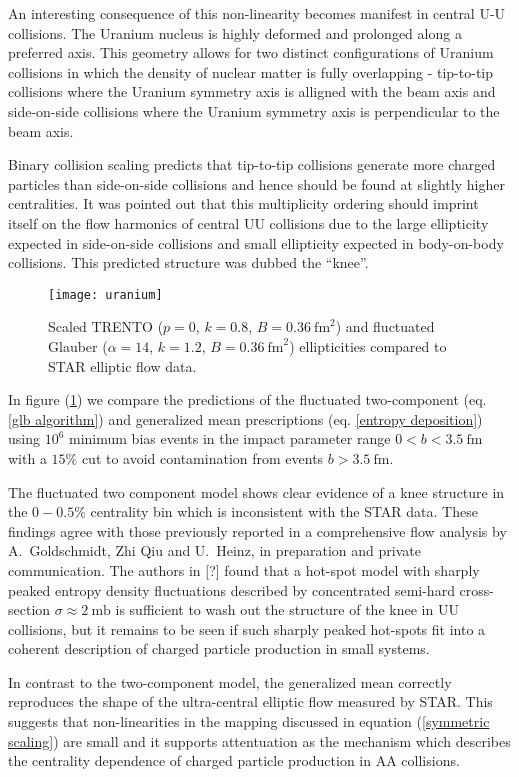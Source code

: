 \documentclass[aps,prl,reprint,amsmath,nofootinbib]{revtex4-1}
\begin{document}
An interesting consequence of this non-linearity becomes manifest in central U-U collisions. The Uranium
nucleus is highly deformed and prolonged along a preferred axis. This geometry allows for two distinct
configurations of Uranium collisions in which the density of nuclear matter is fully overlapping - tip-to-tip
collisions where the Uranium symmetry axis is alligned with the beam axis and side-on-side collisions where
the Uranium symmetry axis is perpendicular to the beam axis.

Binary collision scaling predicts that tip-to-tip collisions generate more charged particles than side-on-side
collisions and hence should be found at slightly higher centralities. It was pointed out that this
multiplicity ordering should imprint itself on the flow harmonics of central UU collisions due to the large
ellipticity expected in side-on-side collisions and small ellipticity expected in body-on-body collisions.
This predicted structure was dubbed the ``knee''.

\begin{figure}
  \centering
  \texttt{[image: uranium]}
  \caption{\label{fig:knee}Scaled TRENTO ($p=0$, $k=0.8$, $B=0.36~\mathrm{fm}^2$) and fluctuated Glauber
  ($\alpha=14$, $k=1.2$, $B=0.36~\mathrm{fm}^2$) ellipticities compared to STAR elliptic flow data.}
\end{figure}

In figure (\ref{fig:knee}) we compare the predictions of the fluctuated two-component (eq. \ref{glb algorithm})
and generalized mean prescriptions (eq. \ref{entropy deposition}) using $10^6$ minimum bias events
in the impact parameter range $0<b<3.5 ~\mathrm{fm}$ with a $15\%$ cut to avoid contamination from events
$b>3.5 ~\mathrm{fm}$.

The fluctuated two component model shows clear evidence of a knee structure in the $0-0.5\%$ centrality bin
which is inconsistent with the STAR data. These findings agree with those previously reported in a
comprehensive flow analysis by A.\ Goldschmidt, Zhi Qiu and U.\ Heinz, in preparation and private communication.
The authors in [?] found that a hot-spot model with sharply peaked entropy density fluctuations described by
concentrated semi-hard cross-section $\sigma \approx 2 ~\mathrm{mb}$ is sufficient to wash out the structure
of the knee in UU collisions, but it remains to be seen if such sharply peaked hot-spots fit into a coherent
description of charged particle production in small systems.

In contrast to the two-component model, the generalized mean correctly reproduces the shape of the
ultra-central elliptic flow measured by STAR. This suggests that non-linearities in the mapping discussed in
equation (\ref{symmetric scaling}) are small and it supports attentuation as the mechanism which describes the
centrality dependence of charged particle production in AA collisions.
\end{document}
